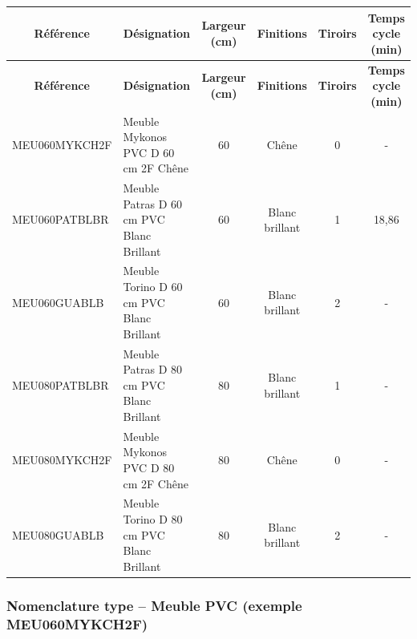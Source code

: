 \documentclass[12pt,a4paper]{article}
\begin{document}
\begin{longtable}{|p{4cm}|p{5cm}|c|c|c|c|}
\hline
\multicolumn{1}{|c|}{\textbf{Référence}} & \multicolumn{1}{c|}{\textbf{Désignation}} & \multicolumn{1}{c|}{\textbf{Largeur (cm)}} & \multicolumn{1}{c|}{\textbf{Finitions}} & \multicolumn{1}{c|}{\textbf{Tiroirs}} & \multicolumn{1}{c|}{\textbf{Temps cycle (min)}} \\
\hline
\endfirsthead
\hline
\multicolumn{1}{|c|}{\textbf{Référence}} & \multicolumn{1}{c|}{\textbf{Désignation}} & \multicolumn{1}{c|}{\textbf{Largeur (cm)}} & \multicolumn{1}{c|}{\textbf{Finitions}} & \multicolumn{1}{c|}{\textbf{Tiroirs}} & \multicolumn{1}{c|}{\textbf{Temps cycle (min)}} \\
\hline
\endhead
\hline
\endfoot
MEU060MYKCH2F & Meuble Mykonos PVC D 60 cm 2F Chêne & 60 & Chêne & 0 & - \\
MEU060PATBLBR & Meuble Patras D 60 cm PVC Blanc Brillant & 60 & Blanc brillant & 1 & 18,86 \\
MEU060GUABLB & Meuble Torino D 60 cm PVC Blanc Brillant & 60 & Blanc brillant & 2 & - \\
MEU080PATBLBR & Meuble Patras D 80 cm PVC Blanc Brillant & 80 & Blanc brillant & 1 & - \\
MEU080MYKCH2F & Meuble Mykonos PVC D 80 cm 2F Chêne & 80 & Chêne & 0 & - \\
MEU080GUABLB & Meuble Torino D 80 cm PVC Blanc Brillant & 80 & Blanc brillant & 2 & - \\
\hline
\end{longtable}

\subsubsection{Nomenclature type – Meuble PVC (exemple MEU060MYKCH2F)}
\end{document}
